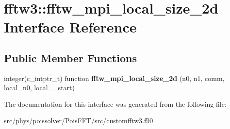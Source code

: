 \hypertarget{interfacefftw3_1_1fftw__mpi__local__size__2d}{}\section{fftw3\+:\+:fftw\+\_\+mpi\+\_\+local\+\_\+size\+\_\+2d Interface Reference}
\label{interfacefftw3_1_1fftw__mpi__local__size__2d}
\subsection*{Public Member Functions}
\begin{DoxyCompactItemize}
\item 
integer(c\+\_\+intptr\+\_\+t) function {\bfseries fftw\+\_\+mpi\+\_\+local\+\_\+size\+\_\+2d} (n0, n1, comm, local\+\_\+n0, local\+\_\+\_\+start)\hypertarget{interfacefftw3_1_1fftw__mpi__local__size__2d_aa8d9583dc85861114577af9aa9bb7ad8}{}\label{interfacefftw3_1_1fftw__mpi__local__size__2d_aa8d9583dc85861114577af9aa9bb7ad8}

\end{DoxyCompactItemize}


The documentation for this interface was generated from the following file\+:\begin{DoxyCompactItemize}
\item 
src/phys/poissolver/\+Pois\+F\+F\+T/src/customfftw3.\+f90\end{DoxyCompactItemize}
